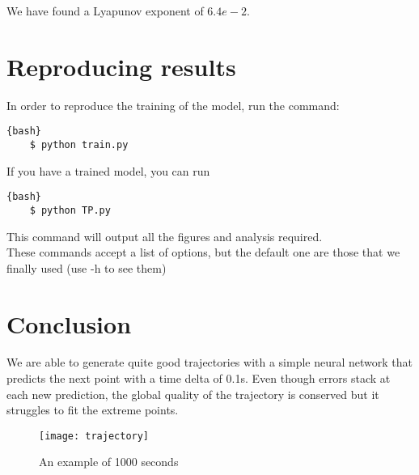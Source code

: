 \documentclass{article}
\begin{document}
We have found a Lyapunov exponent of $6.4e-2$.

\section{Reproducing results}
In order to reproduce the training of the model, run the command:

\begin{lstlisting}{bash}
    $ python train.py
\end{lstlisting}
If you have a trained model, you can run
\begin{lstlisting}{bash}
    $ python TP.py
\end{lstlisting}
This command will output all the figures and analysis required.\\
These commands accept a list of options, but the default one are those that we finally used (use -h to see them)

\section{Conclusion}
We are able to generate quite good trajectories with a simple neural network that predicts the next point with a time delta of 0.1s. Even though errors
stack at each new prediction, the global quality of the trajectory is conserved but it struggles to fit the extreme points.

\begin{figure}[h!]
    \centering
    \texttt{[image: trajectory]}
    \caption{An example of 1000 seconds}
    \label{fig:example}
\end{figure}
\end{document}
